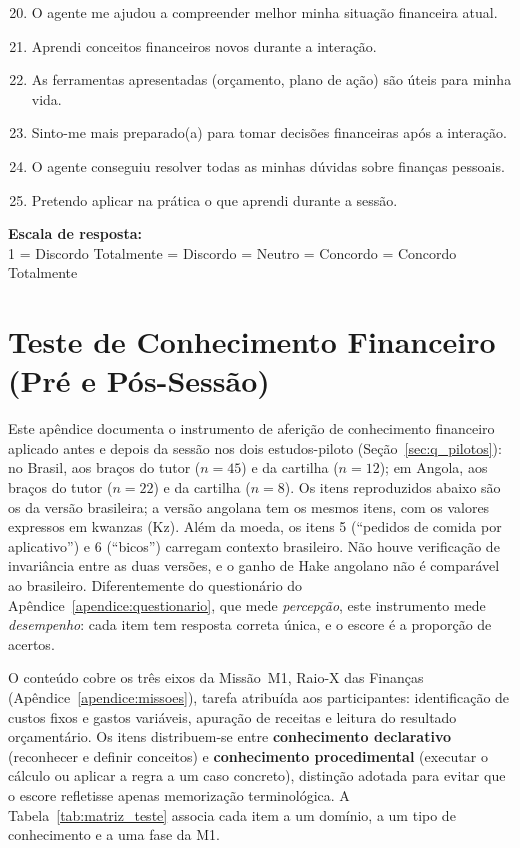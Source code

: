 \begin{enumerate}
\setcounter{enumi}{19}
    \item O agente me ajudou a compreender melhor minha situação financeira atual.
    \item Aprendi conceitos financeiros novos durante a interação.
    \item As ferramentas apresentadas (orçamento, plano de ação) são úteis para minha vida.
    \item Sinto-me mais preparado(a) para tomar decisões financeiras após a interação.
    \item O agente conseguiu resolver todas as minhas dúvidas sobre finanças pessoais.
    \item Pretendo aplicar na prática o que aprendi durante a sessão.
\end{enumerate}

\vspace{1cm}

\noindent\textbf{Escala de resposta:}\\
1 = Discordo Totalmente  = Discordo  = Neutro  = Concordo  = Concordo Totalmente


\chapter{Teste de Conhecimento Financeiro (Pré e Pós-Sessão)}
\label{apendice:teste_conhecimento}

Este apêndice documenta o instrumento de aferição de conhecimento financeiro aplicado antes e
depois da sessão nos dois estudos-piloto (Seção~\ref{sec:q_pilotos}): no Brasil, aos braços do
tutor ($n = 45$) e da cartilha ($n = 12$); em Angola, aos braços do tutor ($n = 22$) e da
cartilha ($n = 8$). Os itens reproduzidos abaixo são os da versão brasileira; a versão
angolana tem os mesmos itens, com os valores expressos em kwanzas (Kz). Além da moeda, os
itens 5 (``pedidos de comida por aplicativo'') e 6 (``bicos'') carregam contexto brasileiro.
Não houve verificação de invariância entre as duas versões, e o ganho de Hake angolano não é
comparável ao brasileiro. Diferentemente do questionário do Apêndice~\ref{apendice:questionario}, que mede
\emph{percepção}, este instrumento mede \emph{desempenho}: cada item tem resposta correta única,
e o escore é a proporção de acertos.

O conteúdo cobre os três eixos da Missão~M1, Raio-X das Finanças
(Apêndice~\ref{apendice:missoes}), tarefa atribuída aos participantes: identificação de custos
fixos e gastos variáveis, apuração de receitas e leitura do resultado orçamentário. Os itens
distribuem-se entre \textbf{conhecimento declarativo} (reconhecer e definir conceitos) e
\textbf{conhecimento procedimental} (executar o cálculo ou aplicar a regra a um caso concreto),
distinção adotada para evitar que o escore refletisse apenas memorização terminológica. A
Tabela~\ref{tab:matriz_teste} associa cada item a um domínio, a um tipo de conhecimento e a uma
fase da M1.

